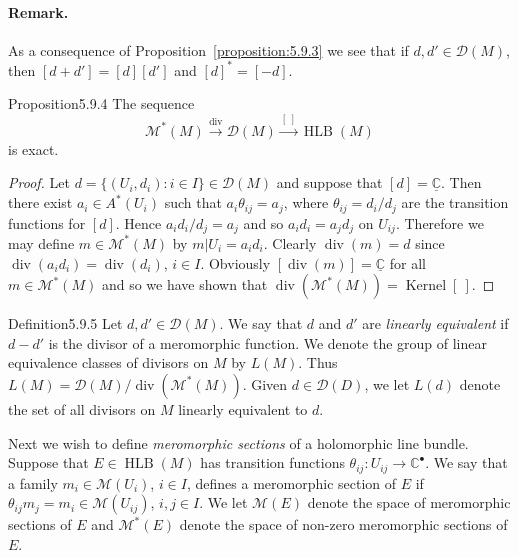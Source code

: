 \paragraph{Remark.} As a consequence of Proposition~\ref{proposition:5.9.3} we see that if $d,d'\in\mathcal D(M)$, then $[d+d']=[d][d']$ and $[d]^*=[-d]$.
\begin{originaltheorem}{Proposition}{5.9.4}
The sequence
\[\mathcal M^*(M)\xrightarrow{\operatorname{div}}\mathcal D(M)\xrightarrow{[\ ]}\operatorname{HLB}(M)\]
is exact.
\end{originaltheorem}
\begin{proof}
Let $d=\{(U_i,d_i):i\in I\}\in\mathcal D(M)$ and suppose that $[d]=\underline{\mathbb C}$. Then there exist $a_i\in A^*(U_i)$ such that $a_i\theta_{ij}=a_j$, where $\theta_{ij}=d_i/d_j$ are the transition functions for $[d]$. Hence $a_id_i/d_j=a_j$ and so $a_id_i=a_jd_j$ on $U_{ij}$. Therefore we may define $m\in\mathcal M^*(M)$ by $m|U_i=a_id_i$. Clearly $\operatorname{div}(m)=d$ since $\operatorname{div}(a_id_i)=\operatorname{div}(d_i)$, $i\in I$. Obviously $[\operatorname{div}(m)]=\underline{\mathbb C}$ for all $m\in\mathcal M^*(M)$ and so we have shown that $\operatorname{div}(\mathcal M^*(M))=\operatorname{Kernel}[\ ]$.
\end{proof}
\begin{originaltheorem}{Definition}{5.9.5}
Let $d,d'\in\mathcal D(M)$. We say that $d$ and $d'$ are \emph{linearly equivalent} if $d-d'$ is the divisor of a meromorphic function. We denote the group of linear equivalence classes of divisors on $M$ by $L(M)$. Thus $L(M)=\mathcal D(M)/\operatorname{div}(\mathcal M^*(M))$. Given $d\in\mathcal D(D)$, we let $L(d)$ denote the set of all divisors on $M$ linearly equivalent to $d$.
\end{originaltheorem}
Next we wish to define \emph{meromorphic sections} of a holomorphic line bundle. Suppose that $E\in\operatorname{HLB}(M)$ has transition functions $\theta_{ij}:U_{ij}\to\mathbb C^\bullet$. We say that a family $m_i\in\mathcal M(U_i)$, $i\in I$, defines a meromorphic section of $E$ if $\theta_{ij}m_j=m_i\in\mathcal M(U_{ij})$, $i,j\in I$. We let $\mathcal M(E)$ denote the space of meromorphic sections of $E$ and $\mathcal M^*(E)$ denote the space of non-zero meromorphic sections of $E$.
